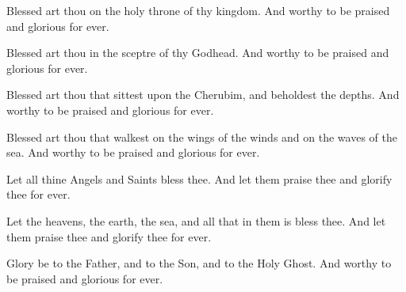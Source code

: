 Blessed art thou on the holy throne of thy kingdom. And worthy to be praised and glorious for ever.

Blessed art thou in the sceptre of thy Godhead. And worthy to be praised and glorious for ever.

Blessed art thou that sittest upon the Cherubim, and beholdest the depths. And worthy to be praised and glorious for ever.

Blessed art thou that walkest on the wings of the winds and on the waves of the sea. And worthy to be praised and glorious for ever.

Let all thine Angels and Saints bless thee. And let them praise thee and glorify thee for ever.

Let the heavens, the earth, the sea, and all that in them is bless thee. And let them praise thee and glorify thee for ever.

Glory be to the Father, and to the Son, and to the Holy Ghost. And worthy to be praised and glorious for ever.

